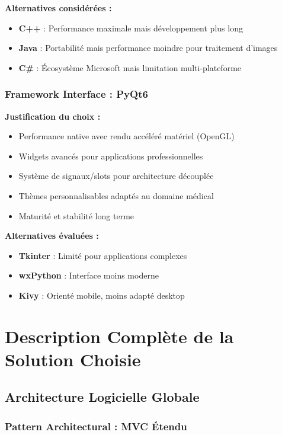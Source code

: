 \documentclass[12pt,a4paper]{report}
\begin{document}
\textbf{Alternatives considérées :}
\begin{itemize}
\item \textbf{C++} : Performance maximale mais développement plus long
\item \textbf{Java} : Portabilité mais performance moindre pour traitement d'images
\item \textbf{C\#} : Écosystème Microsoft mais limitation multi-plateforme
\end{itemize}

\subsubsection{Framework Interface : PyQt6}

\textbf{Justification du choix :}
\begin{itemize}
\item Performance native avec rendu accéléré matériel (OpenGL)
\item Widgets avancés pour applications professionnelles
\item Système de signaux/slots pour architecture découplée
\item Thèmes personnalisables adaptés au domaine médical
\item Maturité et stabilité long terme
\end{itemize}

\textbf{Alternatives évaluées :}
\begin{itemize}
\item \textbf{Tkinter} : Limité pour applications complexes
\item \textbf{wxPython} : Interface moins moderne
\item \textbf{Kivy} : Orienté mobile, moins adapté desktop
\end{itemize}

\section{Description Complète de la Solution Choisie}

\subsection{Architecture Logicielle Globale}

\subsubsection{Pattern Architectural : MVC Étendu}
\end{document}
